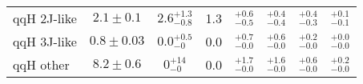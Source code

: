 \begin{tabular}{ l | c | c | c | c | c | c | c }
qqH 2J-like  & $2.1 \pm 0.1 $                & $2.6 ^{+1.3}_{-0.8}$                 & 1.3   & $_{-0.5}^{+0.6}$   & $_{-0.4}^{+0.4}$   & $_{-0.3}^{+0.4}$   & $_{-0.1}^{+0.1}$    \\[3pt]
qqH 3J-like  & $0.8 \pm 0.03$                & $0.0 ^{+0.5}_{-0}$                   & 0.0   & $_{-0.0}^{+0.7}$   & $_{-0.0}^{+0.6}$   & $_{-0.0}^{+0.2}$   & $_{-0.0}^{+0.0}$    \\[3pt]
qqH other    & $8.2 \pm 0.6 $                & $0   ^{+14}_{-0}$                    & 0.0   & $_{-0.0}^{+1.7}$   & $_{-0.0}^{+1.6}$   & $_{-0.0}^{+0.6}$   & $_{-0.0}^{+0.2}$    \\[3pt]
\end{tabular}
